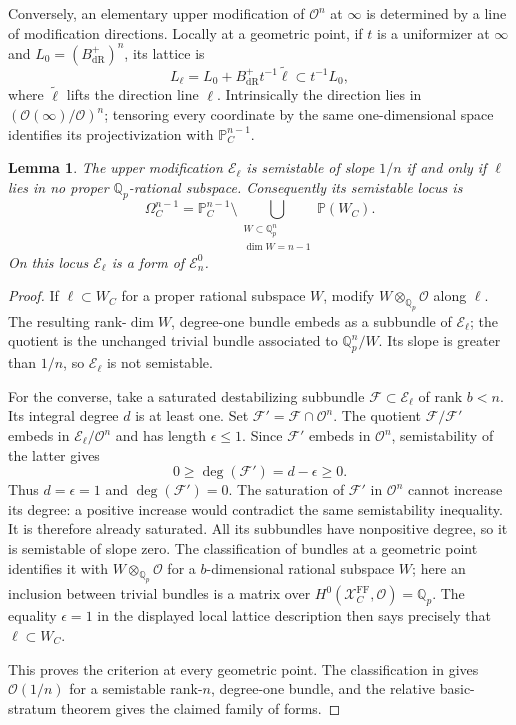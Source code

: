 \documentclass[11pt]{article}
\numberwithin{equation}{section}
\newtheorem{lemma}[theorem]{Lemma}
\theoremstyle{definition}
\theoremstyle{remark}
\begin{document}
Conversely, an elementary upper modification of $\mathcal O^n$ at $\infty$
is determined by a line of modification directions.  Locally at a
geometric point, if $t$ is a uniformizer at $\infty$ and
$L_0=(B_{\mathrm{dR}}^+)^n$, its lattice is
\[
 L_\ell=L_0+B_{\mathrm{dR}}^+t^{-1}\widetilde\ell
       \subset t^{-1}L_0 ,
\]
where $\widetilde\ell$ lifts the direction line $\ell$.
Intrinsically the direction lies in
$(\mathcal O(\infty)/\mathcal O)^n$; tensoring every coordinate by the same
one-dimensional space identifies its projectivization with
$\mathbb P^{n-1}_C$.

\begin{lemma}\label{lem:drinfeld-locus}
The upper modification $\mathcal E_\ell$ is semistable of slope $1/n$
if and only if $\ell$ lies in no proper $\mathbb Q_p$-rational subspace.
Consequently its semistable locus is
\[
 \Omega_C^{n-1}
 =\mathbb P_C^{n-1}\setminus
       \bigcup_{\substack{W\subset\mathbb Q_p^n\\ \dim W=n-1}}\mathbb P(W_C).
\]
On this locus $\mathcal E_\ell$ is a form of $\mathcal E_n^0$.
\end{lemma}

\begin{proof}
If $\ell\subset W_C$ for a proper rational subspace $W$, modify
$W\otimes_{\mathbb Q_p}\mathcal O$ along $\ell$.  The resulting rank-$\dim W$,
degree-one bundle embeds as a subbundle of $\mathcal E_\ell$; the
quotient is the unchanged trivial bundle associated to $\mathbb Q_p^n/W$.
Its slope is greater than $1/n$, so $\mathcal E_\ell$ is not semistable.

For the converse, take a saturated destabilizing subbundle
$\mathcal F\subset\mathcal E_\ell$ of rank $b<n$.
Its integral degree $d$ is at least one.  Set
$\mathcal F'=\mathcal F\cap\mathcal O^n$.  The quotient
$\mathcal F/\mathcal F'$ embeds in $\mathcal E_\ell/\mathcal O^n$ and has
length $\epsilon\leq1$.  Since $\mathcal F'$ embeds in $\mathcal O^n$,
semistability of the latter gives
\[
 0\geq\deg(\mathcal F')=d-\epsilon\geq0.
\]
Thus $d=\epsilon=1$ and $\deg(\mathcal F')=0$.
The saturation of $\mathcal F'$ in $\mathcal O^n$ cannot increase its degree:
a positive increase would contradict the same semistability inequality.
It is therefore already saturated.  All its subbundles have
nonpositive degree, so it is semistable of slope zero.  The
classification of bundles at a geometric point identifies it with
$W\otimes_{\mathbb Q_p}\mathcal O$ for a $b$-dimensional rational subspace $W$;
here an inclusion between trivial bundles is a matrix over
$H^0(\mathcal X_C^{\mathrm{FF}},\mathcal O)=\mathbb Q_p$.
The equality $\epsilon=1$ in the displayed local lattice description
then says precisely that $\ell\subset W_C$.

This proves the criterion at every geometric point.  The classification
in \cite[Theorem II.2.14]{FS} gives $\mathcal O(1/n)$ for a semistable
rank-$n$, degree-one bundle, and the
relative basic-stratum theorem gives the claimed family of forms.
\end{proof}
\end{document}
